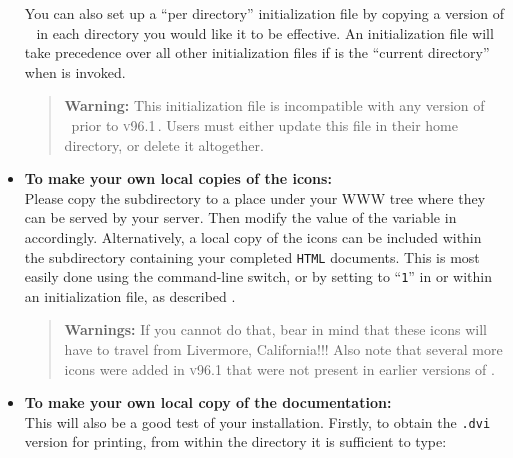 \begin{itemize}
%

You can also set up a ``per directory'' initialization file by 
copying a version of \  in each directory you
would like it to be effective. An initialization file
 will take precedence over all other
initialization files if  is the ``current directory'' when
\latextohtml{} is invoked.

% 
\begin{quotation}\noindent 
\textbf{Warning: }%
This initialization file is incompatible with
any version of \latextohtml\ prior to \textsc{v96.1}\,.  
Users must either update this file in their home directory, 
or delete it altogether.
\end{quotation}

%
\item \label{icondir}%
\textbf{To make your own local copies of the \latextohtml{} icons:} \\
Please copy the  subdirectory to a 
place under your WWW tree
where they can be served by your server.
Then modify the value of the  variable in 
 accordingly.
%
Alternatively, a local copy of the icons can be included within
the subdirectory containing your completed \texttt{HTML} documents.
This is most easily done using the  command-line switch,
or by setting  to ``\texttt{1}'' in 
or within an initialization file, as described .

%
\begin{quotation}\noindent
\textbf{Warnings: }%
If you cannot do that, bear in mind that these icons will have
to travel from Livermore, California!!!
Also note that several more icons were added in \textsc{v96.1}
that were not present in earlier versions of \latextohtml.
\end{quotation}

%
%
\item
\textbf{To make your own local copy of the \latextohtml{}
documentation:} \\
This will also be a good test of your installation. 
%
%
\noindent
Firstly, to obtain the \texttt{.dvi} version for printing,
from within the  directory it is sufficient to type:


\end{itemize}
